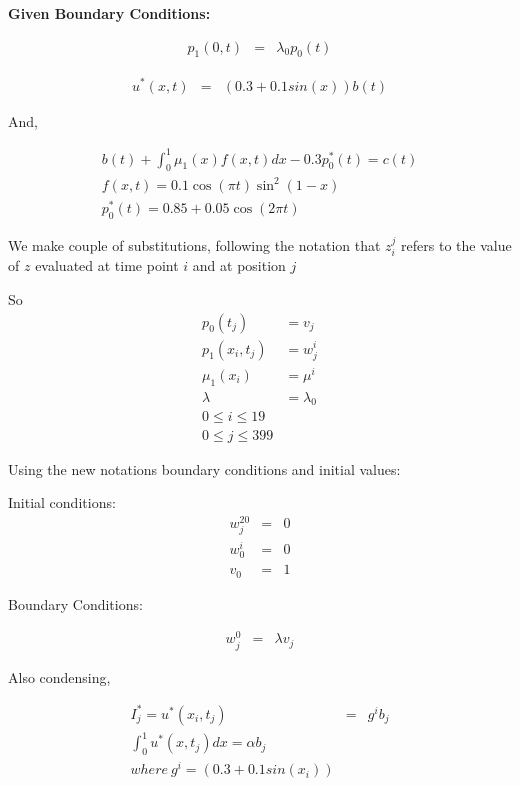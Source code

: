 \documentclass{ifacconf}
\begin{document}
\textbf{Given Boundary Conditions:}

\begin{eqnarray}
p_1(0,t) &=& \lambda_0 p_0(t)
\end{eqnarray}

\begin{eqnarray}
u^{*}(x,t) &=& (0.3+0.1 sin(x))b(t) 
\end{eqnarray}

And,

\begin{eqnarray}
b(t)+\int_0^1\mu_1(x)f(x,t)dx -0.3p_0^{*}(t) = c(t)\\
f(x,t) = 0.1\cos(\pi t)\sin^2(1-x)\\
p_0^{*}(t) = 0.85+0.05\cos(2\pi t)
\end{eqnarray}



We make couple of substitutions, following the notation that
$z_i^j$ refers to the value of $z$ evaluated at time point $i$ and at position $j$

So 
\begin{align}
p_0(t_j) &= v_j \nonumber \\
p_1(x_i,t_j) &= w_j^i \\
\mu_1(x_i) &= \mu^i \\
\lambda &= \lambda_0 \\ 
 0 \leq i \leq 19 \\
 0 \leq j \leq 399
 \end{align} 


Using the new notations boundary conditions and initial values:


Initial conditions:
\begin{eqnarray}
w_j^{20} &=& 0\\
w_0^{i} &=& 0 \\
v_0 &=& 1
\end{eqnarray}

Boundary Conditions:

\begin{eqnarray}
w_j^0 &=&  \lambda v_j
\end{eqnarray}

Also condensing,


\begin{eqnarray}
	I_j^{*}=u^{*}(x_i,t_j) &=& g^ib_j \\
\int_0^1 u^{*}(x,t_j)dx = \alpha b_j\\
where\ g^i = (0.3+0.1sin(x_i)) \nonumber
\end{eqnarray}
\end{document}

